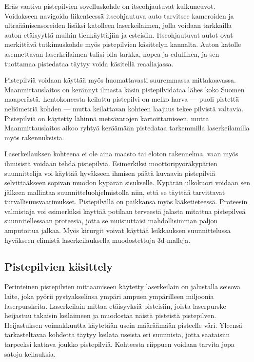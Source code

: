Eräs vaativa pistepilvien sovelluskohde on itseohjautuvat kulkuneuvot. Voidakseen navigoida liikenteessä itseohjautuva auto tarvitsee kameroiden ja ultraäänisensoreiden lisäksi katolleen laserkeilaimen, jolla voidaan tarkkailla auton etäisyyttä muihin tienkäyttäjiin ja esteisiin. Itseohjautuvat autot ovat merkittävä tutkimuskohde myös pistepilvien käsittelyn kannalta. Auton katolle asennettavan laserkeilaimen tulisi olla tarkka, nopea ja edullinen, ja sen tuottamaa pistedataa täytyy voida käsitellä reaaliajassa. \cite{car} 

Pistepilviä voidaan käyttää myös huomattavasti suuremmassa mittakaavassa. Maanmittauslaitos on kerännyt ilmasta käsin pistepilvidataa lähes koko Suomen maaperästä. Lentokoneesta keilattu pistepilvi on melko harva — puoli pistettä neliömetriä kohden — mutta keilattavan kohteen laajuus tekee pilvistä valtavia. Pistepilviä on käytetty lähinnä metsävarojen kartoittamiseen, mutta Maanmittauslaitos aikoo ryhtyä keräämään pistedataa tarkemmilla laserkeilamilla myös rakennuksista. \cite{hs}

Laserkeilauksen kohteena ei ole aina maasto tai eloton rakennelma, vaan myös ihmisistä voidaan tehdä pistepilviä. Esimerkiksi moottoripyöräkypärien suunnittelija voi käyttää hyväkseen ihmisen päätä kuvaavia pistepilviä selvittääkseen sopivan muodon kypärän sisukselle. Kypärän ulkokuori voidaan sen jälkeen mallintaa suunnitteluohjelmistolla niin, että se täyttää tarvittavat turvallisuusvaatimukset. Pistepilvillä on paikkansa myös lääketieteessä. Proteesin valmistaja voi esimerkiksi käyttää potilaan terveestä jalasta mitattua pistepilveä suunnitellessaan proteesia, jotta se muistuttaisi mahdollisimman paljon amputoitua jalkaa. Myös kirurgit voivat käyttää leikkauksen suunnittelussa hyväkseen elimistä laserkeilauksella muodostettuja 3d-malleja. \cite{saxena}  



\subsection{Pistepilvien käsittely}\label{workflow}

Perinteinen pistepilvien mittaamiseen käytetty laserkeilain on jalustalla seisova laite, joka pyörii pystyakselinsa ympäri ampuen ympärilleen miljoonia laserpurskeita. Laserkeilain mittaa etäisyyksiä pisteisiin, joista laserpurske heijastuu takaisin keilaimeen ja muodostaa näistä pisteistä pistepilven. Heijastuksen voimakkuutta käytetään usein määräämään pisteelle väri. Yleensä tarkasteltavaa kohdetta täytyy keilata useista eri suunnista, jotta saataisiin tarpeeksi kattava joukko pistepilviä. Kohteesta riippuen voidaan tarvita jopa satoja keilauksia.

